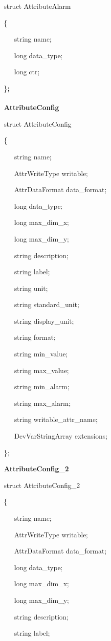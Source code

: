 struct AttributeAlarm

\{

~~~string name;

~~~long data\_type;

~~~long ctr;

\}\textbf{;}\\
\textbf{}\\
\textbf{AttributeConfig}

struct AttributeConfig

\{

~~~string name;

~~~AttrWriteType writable;

~~~AttrDataFormat data\_format;

~~~long data\_type;

~~~long max\_dim\_x;

~~~long max\_dim\_y;

~~~string description;

~~~string label;

~~~string unit;

~~~string standard\_unit;

~~~string display\_unit;

~~~string format;

~~~string min\_value;

~~~string max\_value;

~~~string min\_alarm;

~~~string max\_alarm;

~~~string writable\_attr\_name;

~~~DevVarStringArray extensions;

\};\\

\begin{flushleft}
\textbf{AttributeConfig\_2}
\par\end{flushleft}

struct AttributeConfig\_2

\{

~~~string name;

~~~AttrWriteType writable;

~~~AttrDataFormat data\_format;

~~~long data\_type;

~~~long max\_dim\_x;

~~~long max\_dim\_y;

~~~string description;

~~~string label;

